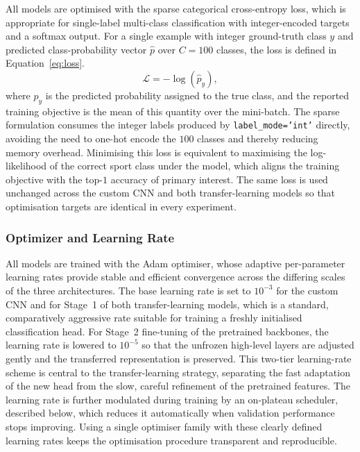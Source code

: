 All models are optimised with the sparse categorical cross-entropy loss, which is appropriate for single-label multi-class classification with integer-encoded targets and a softmax output.
For a single example with integer ground-truth class $y$ and predicted class-probability vector $\hat{p}$ over $C=100$ classes, the loss is defined in Equation~\eqref{eq:loss}.
\begin{equation}
\label{eq:loss}
\mathcal{L} = -\log\left(\hat{p}_{y}\right),
\end{equation}
where $\hat{p}_{y}$ is the predicted probability assigned to the true class, and the reported training objective is the mean of this quantity over the mini-batch.
The sparse formulation consumes the integer labels produced by \texttt{label\_mode='int'} directly, avoiding the need to one-hot encode the $100$ classes and thereby reducing memory overhead.
Minimising this loss is equivalent to maximising the log-likelihood of the correct sport class under the model, which aligns the training objective with the top-$1$ accuracy of primary interest.
The same loss is used unchanged across the custom CNN and both transfer-learning models so that optimisation targets are identical in every experiment.

\subsubsection{Optimizer and Learning Rate}
\label{subsubsec:method-optimizer}

All models are trained with the Adam optimiser, whose adaptive per-parameter learning rates provide stable and efficient convergence across the differing scales of the three architectures.
The base learning rate is set to $10^{-3}$ for the custom CNN and for Stage~1 of both transfer-learning models, which is a standard, comparatively aggressive rate suitable for training a freshly initialised classification head.
For Stage~2 fine-tuning of the pretrained backbones, the learning rate is lowered to $10^{-5}$ so that the unfrozen high-level layers are adjusted gently and the transferred representation is preserved.
This two-tier learning-rate scheme is central to the transfer-learning strategy, separating the fast adaptation of the new head from the slow, careful refinement of the pretrained features.
The learning rate is further modulated during training by an on-plateau scheduler, described below, which reduces it automatically when validation performance stops improving.
Using a single optimiser family with these clearly defined learning rates keeps the optimisation procedure transparent and reproducible.

